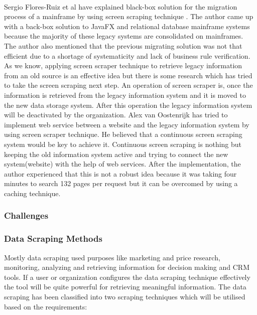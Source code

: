 \paragraph{}
Sergio Flores-Ruiz et al have explained black-box solution for the migration process of a mainframe by using screen scraping technique \cite{FlPeDoPu2018}. The author came up with a back-box solution to JavaFX and relational database mainframe systems because the majority of these legacy systems are consolidated on mainframes. The author also mentioned that the previous migrating solution was not that efficient due to a shortage of systematicity and lack of business rule verification. As we know, applying screen scraper technique to retrieve legacy information from an old source is an effective idea but there is some research which has tried to take the screen scraping next step. An operation of screen scraper is, once the information is retrieved from the legacy information system and it is moved to the new data storage system. After this operation the legacy information system will be deactivated by the organization. Alex van Oostenrijk \cite{Alex2004} has tried to implement web service between a website and the legacy information system by using screen scraper technique. He believed that a continuous screen scraping system would be key to achieve it. Continuous screen scraping is nothing but keeping the old information system active and trying to connect the new system(website) with the help of web services. After the implementation, the author experienced that this is not a robust idea because it was taking four minutes to search 132 pages per request but it can be overcomed by using a caching technique.

\subsubsection{Challenges}
%
%

%
%
\subsubsection{Data Scraping Methods}
Mostly data scraping used purposes like marketing and price research, monitoring, analyzing and retrieving information for decision making and CRM tools. If a user or organization configures the data scraping technique effectively the tool will be quite powerful for retrieving meaningful information. The data scraping has been classified into two scraping techniques which will be utilised based on the requirements:

